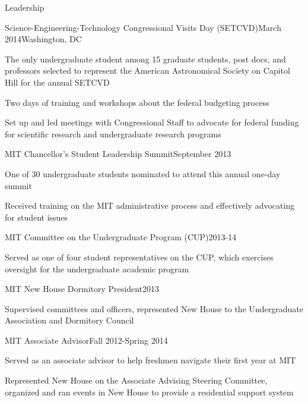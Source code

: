 \documentclass{resume} %
\begin{document}
\begin{rSection}{Leadership}

  \begin{rSubsection}{Science-Engineering-Technology Congressional Visits Day (SETCVD)}{March 2014}{}{Washington, DC}
  \item The only undergraduate student among 15 graduate students, post docs, and professors selected to represent the American Astronomical Society on Capitol Hill for the annual SETCVD
  \item Two days of training and workshops about the federal budgeting process 
  \item Set up and led meetings with Congressional Staff to advocate for federal funding for scientific research and undergraduate research programs
  \end{rSubsection}

\begin{rSubsection}{MIT Chancellor's Student Leadership Summit}{September 2013}{}{}
\item One of 30 undergraduate students nominated to attend this annual one-day summit
\item Received training on the MIT administrative process and effectively advocating for student issues 
\end{rSubsection}

\begin{rSubsection}{MIT Committee on the Undergraduate Program (CUP)}{2013-14}{}{}
\item Served as one of four student representatives on the CUP, which exercises oversight for the undergraduate academic program
\end{rSubsection}

\begin{rSubsection}{MIT New House Dormitory President}{2013}{}{}
\item Supervised committees and officers, represented New House to the Undergraduate Association and Dormitory Council
\end{rSubsection}

\begin{rSubsection}{MIT Associate Advisor}{Fall 2012-Spring 2014}{}{}
\item Served as an associate advisor to help freshmen navigate their first year at MIT
\item Represented New House on the Associate Advising Steering Committee, organized and ran events in New House to provide a residential support system
\end{rSubsection}

\end{rSection}
\end{document}
